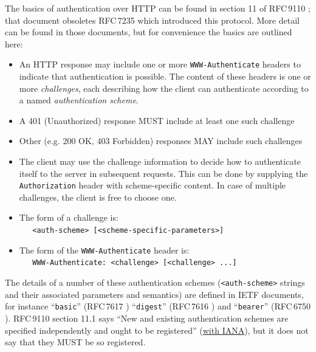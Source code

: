\documentclass[11pt,a4paper]{ivoa}
\newcommand{\rfc}[1]{RFC\,#1}
\newcommand{\header}[1]{{\tt #1}}
\begin{document}
The basics of authentication over HTTP can be found in
section 11 of \rfc{9110} \citep{std:RFC9110};
that document obsoletes \rfc{7235} \citep{std:RFC7235}
which introduced this protocol.
More detail can be found in those documents, but for convenience
the basics are outlined here:
\begin{itemize}
  \item An HTTP response may include one or more 
        \header{WWW-Authenticate} headers
        to indicate that authentication is possible.
        The content of these headers is one or more {\em challenges},
        each describing how the client can authenticate according
        to a named {\em authentication scheme}.
  \item A 401 (Unauthorized) response MUST include at least one such challenge
  \item Other (e.g. 200 OK, 403 Forbidden) responses
        MAY include such challenges
  \item The client may use the challenge information to decide how
        to authenticate itself to the server in subsequent requests.
        This can be done by supplying the \header{Authorization} header
        with scheme-specific content.
        In case of multiple challenges, the client is free to choose one.
  \item The form of a challenge is:\\
        \verb|   <auth-scheme> [<scheme-specific-parameters>]|
  \item The form of the \header{WWW-Authenticate} header is:\\
        \verb|   WWW-Authenticate: <challenge> [<challenge> ...]|
\end{itemize}


The details of a number of these authentication schemes
(\verb|<auth-scheme>| strings and their associated parameters and semantics)
are defined in IETF documents, for instance
``{\tt basic}'' (\rfc{7617} \citet{std:RFC7617})
``{\tt digest}'' (\rfc{7616} \citet{std:RFC7616})
and
``{\tt bearer}'' (\rfc{6750} \citet{std:RFC6750}).
\rfc{9110} section 11.1 says
``New and existing authentication schemes are
  specified independently and ought to be registered''
  (\href{https://www.iana.org/assignments/http-authschemes}{with IANA}),
but it does not say that they MUST be so registered.
\end{document}

